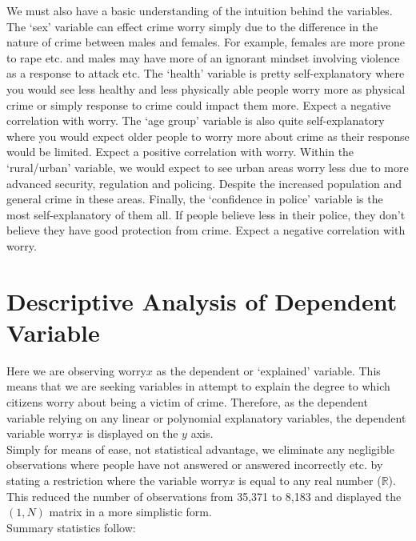 \documentclass[11pt, english]{article}
\begin{document}
	We must also have a basic understanding of the intuition behind the variables. The `sex' variable can effect crime worry simply due to the difference in the nature of crime between males and females. For example, females are more prone to rape etc. and males may have more of an ignorant mindset involving violence as a response to attack etc. The ‘health’ variable is pretty self-explanatory where you would see less healthy and less physically able people worry more as physical crime or simply response to crime could impact them more. Expect a negative correlation with worry. The `age group' variable is also quite self-explanatory where you would expect older people to worry more about crime as their response would be limited. Expect a positive correlation with worry. Within the `rural/urban' variable, we would expect to see urban areas worry less due to more advanced security, regulation and policing. Despite the increased population and general crime in these areas. Finally, the `confidence in police' variable is the most self-explanatory of them all. If people believe less in their police, they don’t believe they have good protection from crime. Expect a negative correlation with worry.

\newpage

\section{Descriptive Analysis of Dependent Variable}

	Here we are observing worry$x$ as the dependent or `explained' variable. This means that we are seeking variables in attempt to explain the degree to which citizens worry about being a victim of crime. Therefore, as the dependent variable relying on any linear or polynomial explanatory variables, the dependent variable worry$x$ is displayed on the $y$ axis.\\

	Simply for means of ease, not statistical advantage, we eliminate any negligible observations where people have not answered or answered incorrectly etc. by stating a restriction where the variable worry$x$ is equal to any real number ($\mathbb{R}$). This reduced the number of observations from 35,371 to 8,183 and displayed the $(1,N)$ matrix in a more simplistic form.\\

	Summary statistics follow:\\
\end{document}
